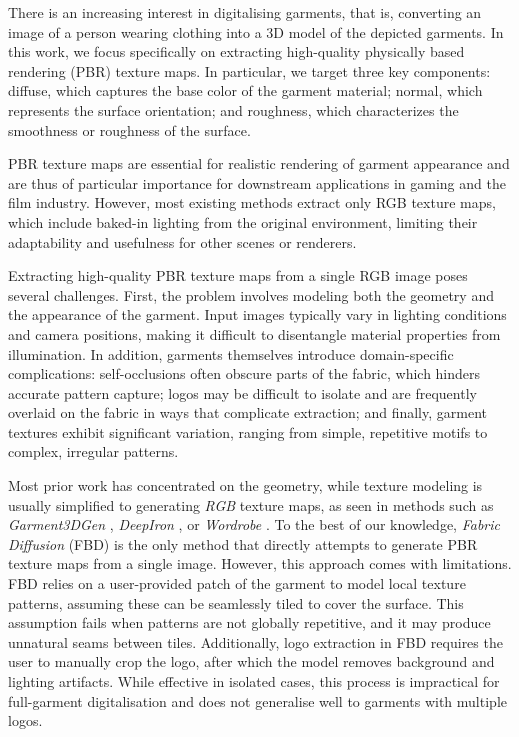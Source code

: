 \documentclass[11pt,twocolumn]{article}
\begin{document}
There is an increasing interest in digitalising garments, that is, converting an image of a person wearing clothing into a 3D model 
of the depicted garments. In this work, we focus specifically on extracting high-quality physically based rendering (PBR) 
texture maps. In particular, we target three key components: diffuse, which captures the base color of the garment material; 
normal, which represents the surface orientation; and roughness, which characterizes the smoothness or roughness of the surface.

PBR texture maps are essential for realistic rendering of garment appearance and are thus of particular importance for downstream applications 
in gaming and the film industry. However, most existing methods extract only RGB texture maps, 
which include baked-in lighting from the original environment, limiting their adaptability and usefulness for other 
scenes or renderers.

Extracting high-quality PBR texture maps from a single RGB image poses several challenges. 
First, the problem involves modeling both the geometry and the appearance of the garment. 
Input images typically vary in lighting conditions and camera positions, making it difficult to disentangle material 
properties from illumination. In addition, garments themselves introduce domain-specific complications: 
self-occlusions often obscure parts of the fabric, which hinders accurate pattern capture; 
logos may be difficult to isolate and are frequently overlaid on the fabric in ways that complicate extraction; 
and finally, garment textures exhibit significant variation, ranging from simple, repetitive motifs to complex, 
irregular patterns.

Most prior work has concentrated on the geometry, while texture modeling is usually simplified to generating \textit{RGB} 
texture maps, as seen in methods such as \textit{Garment3DGen} \cite{garment3dgen}, \textit{DeepIron} \cite{deepiron}, 
or \textit{Wordrobe} \cite{WordRobe}. To the best of our knowledge, \textit{Fabric Diffusion} (FBD) \cite{fabricdiffusion} is 
the only method that directly attempts to generate PBR texture maps from a single image. 
However, this approach comes with limitations. FBD relies on a user-provided patch of the garment to model local 
texture patterns, assuming these can be seamlessly tiled to cover the surface. This assumption fails when patterns are not 
globally repetitive, and it may produce unnatural seams between tiles. 
Additionally, logo extraction in FBD requires the user to manually crop the logo, 
after which the model removes background and lighting artifacts. 
While effective in isolated cases, this process is impractical for full-garment digitalisation and does not 
generalise well to garments with multiple logos.
\end{document}
